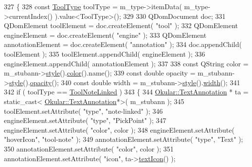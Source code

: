 \begin{DoxyCode}
327 \{
328     \textcolor{keyword}{const} \hyperlink{classEditAnnotToolDialog_ae4572c0cf4fc351cf03e4d86ef595a9c}{ToolType} toolType = m\_type->itemData( m\_type->currentIndex() ).value<ToolType>();
329 
330     QDomDocument doc;
331     QDomElement toolElement = doc.createElement( \textcolor{stringliteral}{"tool"} );
332     QDomElement engineElement = doc.createElement( \textcolor{stringliteral}{"engine"} );
333     QDomElement annotationElement = doc.createElement( \textcolor{stringliteral}{"annotation"} );
334     doc.appendChild( toolElement );
335     toolElement.appendChild( engineElement );
336     engineElement.appendChild( annotationElement );
337 
338     \textcolor{keyword}{const} QString color = m\_stubann->\hyperlink{classOkular_1_1Annotation_ae1f845ddbd6d524b2b388c6c9ef26423}{style}().\hyperlink{classOkular_1_1Annotation_1_1Style_a2c32cb2b41ef8732ddcd3d3dffc20b7d}{color}().name();
339     \textcolor{keyword}{const} \textcolor{keywordtype}{double} opacity = m\_stubann->\hyperlink{classOkular_1_1Annotation_ae1f845ddbd6d524b2b388c6c9ef26423}{style}().\hyperlink{classOkular_1_1Annotation_1_1Style_abb17b057d91f128793b3fa3d4b556a45}{opacity}();
340     \textcolor{keyword}{const} \textcolor{keywordtype}{double} width = m\_stubann->\hyperlink{classOkular_1_1Annotation_ae1f845ddbd6d524b2b388c6c9ef26423}{style}().\hyperlink{classOkular_1_1Annotation_1_1Style_a5a8e23f3a4f95e25f45770937dc82948}{width}();
341 
342     \textcolor{keywordflow}{if} ( toolType == \hyperlink{classEditAnnotToolDialog_ae4572c0cf4fc351cf03e4d86ef595a9ca87068985a2e61ea99764542268551c13}{ToolNoteLinked} )
343     \{
344         \hyperlink{classOkular_1_1TextAnnotation}{Okular::TextAnnotation} * ta = \textcolor{keyword}{static\_cast<}
      \hyperlink{classOkular_1_1TextAnnotation}{Okular::TextAnnotation}*\textcolor{keyword}{>}( m\_stubann );
345         toolElement.setAttribute( \textcolor{stringliteral}{"type"}, \textcolor{stringliteral}{"note-linked"} );
346         engineElement.setAttribute( \textcolor{stringliteral}{"type"}, \textcolor{stringliteral}{"PickPoint"} );
347         engineElement.setAttribute( \textcolor{stringliteral}{"color"}, color );
348         engineElement.setAttribute( \textcolor{stringliteral}{"hoverIcon"}, \textcolor{stringliteral}{"tool-note"} );
349         annotationElement.setAttribute( \textcolor{stringliteral}{"type"}, \textcolor{stringliteral}{"Text"} );
350         annotationElement.setAttribute( \textcolor{stringliteral}{"color"}, color );
351         annotationElement.setAttribute( \textcolor{stringliteral}{"icon"}, ta->\hyperlink{classOkular_1_1TextAnnotation_a40844236e2ea8684a6b439c2c3784821}{textIcon}() );

\end{DoxyCode}
